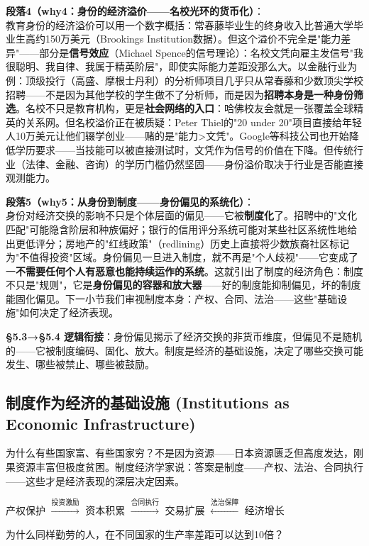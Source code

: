 \documentclass[../main.tex]{subfiles}
\begin{document}
	\textbf{段落4（why4：身份的经济溢价——名校光环的货币化）}：\\
	教育身份的经济溢价可以用一个数字概括：常春藤毕业生的终身收入比普通大学毕业生高约150万美元（Brookings Institution数据）。但这个溢价不完全是"能力差异"——部分是\textbf{信号效应}（Michael Spence的信号理论）：名校文凭向雇主发信号"我很聪明、我自律、我属于精英阶层"，即使实际能力差距没那么大。以金融行业为例：顶级投行（高盛、摩根士丹利）的分析师项目几乎只从常春藤和少数顶尖学校招聘——不是因为其他学校的学生做不了分析师，而是因为\textbf{招聘本身是一种身份筛选}。名校不只是教育机构，更是\textbf{社会网络的入口}：哈佛校友会就是一张覆盖全球精英的关系网。但名校溢价正在被质疑：Peter Thiel的"20 under 20"项目直接给年轻人10万美元让他们辍学创业——赌的是"能力>文凭"。Google等科技公司也开始降低学历要求——当技能可以被直接测试时，文凭作为信号的价值在下降。但传统行业（法律、金融、咨询）的学历门槛仍然坚固——身份溢价取决于行业是否能直接观测能力。

	\textbf{段落5（why5：从身份到制度——身份偏见的系统化）}：\\
	身份对经济交换的影响不只是个体层面的偏见——它被\textbf{制度化}了。招聘中的"文化匹配"可能隐含阶层和种族偏好；银行的信用评分系统可能对某些社区系统性地给出更低评分；房地产的"红线政策"（redlining）历史上直接将少数族裔社区标记为"不值得投资"区域。身份偏见一旦进入制度，就不再是"个人歧视"——它变成了一\textbf{不需要任何个人有恶意也能持续运作的系统}。这就引出了制度的经济角色：制度不只是"规则"，它是\textbf{身份偏见的容器和放大器}——好的制度能抑制偏见，坏的制度能固化偏见。下一小节我们审视制度本身：产权、合同、法治——这些"基础设施"如何决定了经济表现。

	\textbf{§5.3→§5.4 逻辑衔接}：身份偏见揭示了经济交换的非货币维度，但偏见不是随机的——它被制度编码、固化、放大。制度是经济的基础设施，决定了哪些交换可能发生、哪些被禁止、哪些被鼓励。

	\subsection{制度作为经济的基础设施 (Institutions as Economic Infrastructure)}
	\begin{motivation}
		为什么有些国家富、有些国家穷？不是因为资源——日本资源匮乏但高度发达，刚果资源丰富但极度贫困。制度经济学家说：答案是制度——产权、法治、合同执行——这些才是经济表现的深层决定因素。
	\end{motivation}
	\begin{logicmap}
		产权保护 $\xrightarrow{\text{投资激励}}$ 资本积累 $\xrightarrow{\text{合同执行}}$ 交易扩展 $\xleftarrow{\text{法治保障}}$ 经济增长
	\end{logicmap}
	\begin{questionbox}
		为什么同样勤劳的人，在不同国家的生产率差距可以达到10倍？
	\end{questionbox}
\end{document}
